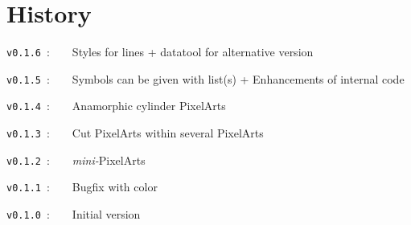 \documentclass{article}
\begin{document}
\begin{PresentationCode}{}


\end{PresentationCode}

\newpage

\part{History}

\verb|v0.1.6|~:~~~~Styles for lines + \textsf{datatool} for alternative version

\verb|v0.1.5|~:~~~~Symbols can be given with list(s) + Enhancements of internal code

\verb|v0.1.4|~:~~~~Anamorphic cylinder PixelArts

\verb|v0.1.3|~:~~~~Cut PixelArts within several PixelArts

\verb|v0.1.2|~:~~~~\textit{mini-}PixelArts

\verb|v0.1.1|~:~~~~Bugfix with color

\verb|v0.1.0|~:~~~~Initial version
\end{document}
